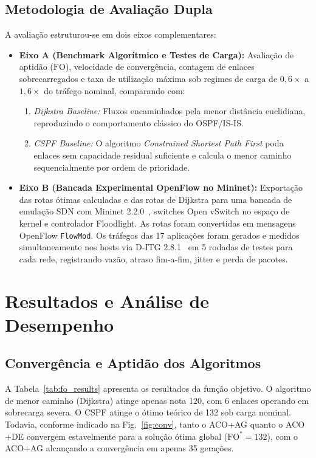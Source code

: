 \documentclass[journal]{IEEEtran}
\newcommand{\FO}{\mathrm{FO}}
\begin{document}
\subsection{Metodologia de Avalia\c{c}\~{a}o Dupla}
A avalia\c{c}\~{a}o estruturou-se em dois eixos complementares:
\begin{itemize}
    \item \textbf{Eixo A (Benchmark Algor\'{i}tmico e Testes de Carga):} Avalia\c{c}\~{a}o de aptid\~{a}o ($\FO$), velocidade de converg\^{e}ncia, contagem de enlaces sobrecarregados e taxa de utiliza\c{c}\~{a}o m\'{a}xima sob regimes de carga de $0,6\times$ a $1,6\times$ do tr\'{a}fego nominal, comparando com:
    \begin{enumerate}
        \item \emph{Dijkstra Baseline:} Fluxos encaminhados pela menor dist\^{a}ncia euclidiana, reproduzindo o comportamento cl\'{a}ssico do OSPF/IS-IS.
        \item \emph{CSPF Baseline:} O algoritmo \emph{Constrained Shortest Path First} poda enlaces sem capacidade residual suficiente e calcula o menor caminho sequencialmente por ordem de prioridade.
    \end{enumerate}
    \item \textbf{Eixo B (Bancada Experimental OpenFlow no Mininet):} Exporta\c{c}\~{a}o das rotas \'{o}timas calculadas e das rotas de Dijkstra para uma bancada de emula\c{c}\~{a}o SDN com Mininet 2.2.0~\cite{lantz2010network}, switches Open vSwitch no espa\c{c}o de kernel e controlador Floodlight. As rotas foram convertidas em mensagens OpenFlow \texttt{FlowMod}. Os tr\'{a}fegos das 17 aplica\c{c}\~{o}es foram gerados e medidos simultaneamente nos hosts via D-ITG 2.8.1~\cite{botta2012itg} em 5 rodadas de testes para cada rede, registrando vaz\~{a}o, atraso fim-a-fim, jitter e perda de pacotes.
\end{itemize}

\section{Resultados e An\'{a}lise de Desempenho}
\label{sec:resultados}

\subsection{Converg\^{e}ncia e Aptid\~{a}o dos Algoritmos}
A Tabela~\ref{tab:fo_results} apresenta os resultados da fun\c{c}\~{a}o objetivo. O algoritmo de menor caminho (Dijkstra) atinge apenas nota 120, com 6 enlaces operando em sobrecarga severa. O CSPF atinge o \'{o}timo te\'{o}rico de 132 sob carga nominal. Todavia, conforme indicado na Fig.~\ref{fig:conv}, tanto o ACO$+$AG quanto o ACO$+$DE convergem estavelmente para a solu\c{c}\~{a}o \'{o}tima global ($\FO^* = 132$), com o ACO$+$AG alcan\c{c}ando a converg\^{e}ncia em apenas 35 gera\c{c}\~{o}es.
\end{document}
